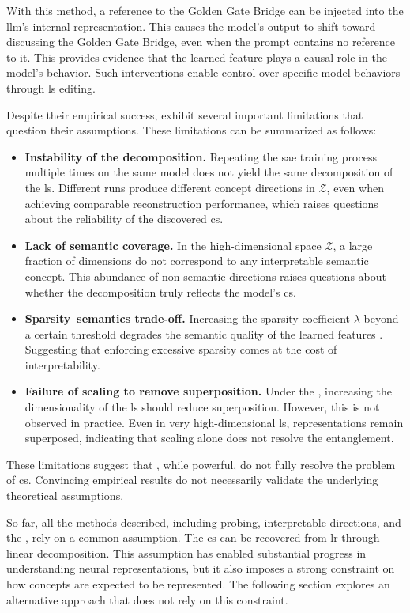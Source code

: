 With this method, a reference to the Golden Gate Bridge can be injected into the \gls{llm}'s internal representation.
This causes the model's output to shift toward discussing the Golden Gate Bridge, even when the prompt contains no reference to it.
This provides evidence that the learned feature plays a causal role in the model's behavior.
Such interventions enable control over specific model behaviors through \gls{ls} editing.

Despite their empirical success, \SuperpositionHypothesisName exhibit several important limitations that question their assumptions. 
These limitations can be summarized as follows:
\begin{itemize}
    \item \textbf{Instability of the decomposition.}
    Repeating the \gls{sae} training process multiple times on the same model does not yield the same decomposition of the \gls{ls}.
    Different runs produce different concept directions in $\mathcal{Z}$, even when achieving comparable reconstruction performance, which raises questions about the reliability of the discovered \gls{cs}.

    \item \textbf{Lack of semantic coverage.}
    In the high-dimensional space $\mathcal{Z}$, a large fraction of dimensions do not correspond to any interpretable semantic concept.
    This abundance of non-semantic directions raises questions about whether the decomposition truly reflects the model’s \gls{cs}.

    \item \textbf{Sparsity--semantics trade-off.}
    Increasing the sparsity coefficient $\lambda$ beyond a certain threshold degrades the semantic quality of the learned features \cite{tanhPenaltyDictionaryLearning}.
    Suggesting that enforcing excessive sparsity comes at the cost of interpretability.

    \item \textbf{Failure of scaling to remove superposition.}
    Under the \SuperpositionHypothesisName, increasing the dimensionality of the \gls{ls} should reduce superposition.
    However, this is not observed in practice.
    Even in very high-dimensional \gls{ls}, representations remain superposed, indicating that scaling alone does not resolve the entanglement.
\end{itemize}

These limitations suggest that \SuperpositionHypothesisName, while powerful, do not fully resolve the problem of \gls{cs}.
Convincing empirical results do not necessarily validate the underlying theoretical assumptions.

So far, all the methods described, including probing, interpretable directions, and the \SuperpositionHypothesisName, rely on a common assumption.
The \gls{cs} can be recovered from \gls{lr} through linear decomposition.
This assumption has enabled substantial progress in understanding neural representations, but it also imposes a strong constraint on how concepts are expected to be represented.
The following section explores an alternative approach that does not rely on this constraint.